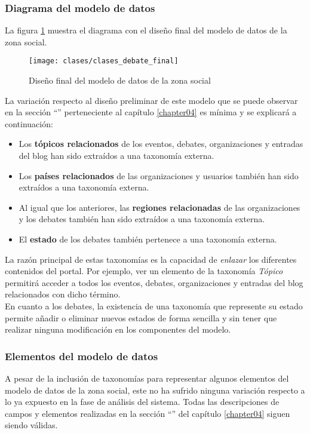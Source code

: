 \subsubsection{Diagrama del modelo de datos}
La figura \ref{fig:diagrama_modelo_social_final} muestra el diagrama con el diseño final del modelo de datos de la zona social.
\begin{landscape}
	\begin{figure}[h]
		\centering
		\texttt{[image: clases/clases\_debate\_final]}
		\caption{Diseño final del modelo de datos de la zona social}
		\label{fig:diagrama_modelo_social_final}
	\end{figure}
\end{landscape}

La variación respecto al diseño preliminar de este modelo que se puede observar en la sección ``'' perteneciente al capítulo \ref{chapter04} es mínima y se explicará a continuación:
\begin{itemize}
	\item Los \textbf{tópicos relacionados} de los eventos, debates, organizaciones y entradas del blog han sido extraídos a una taxonomía externa.
	\item Los \textbf{países relacionados} de las organizaciones y usuarios también han sido extraídos a una taxonomía externa.
	\item Al igual que los anteriores, las \textbf{regiones relacionadas} de las organizaciones y los debates también han sido extraídos a una taxonomía externa.
	\item El \textbf{estado} de los debates también pertenece a una taxonomía externa.
\end{itemize}

La razón principal de estas taxonomías es la capacidad de \textit{enlazar} los diferentes contenidos del portal.  Por ejemplo, ver un elemento de la taxonomía \textit{Tópico} permitirá acceder a todos los eventos, debates, organizaciones y entradas del blog relacionados con dicho término.\\
En cuanto a los debates, la existencia de una taxonomía que represente su estado permite añadir o eliminar nuevos estados de forma sencilla y sin tener que realizar ninguna modificación en los componentes del modelo.

\subsubsection{Elementos del modelo de datos}
A pesar de la inclusión de taxonomías para representar algunos elementos del modelo de datos de la zona social, este no ha sufrido ninguna variación respecto a lo ya expuesto en la fase de análisis del sistema. Todas las descripciones de campos y elementos realizadas en la sección ``'' del capítulo \ref{chapter04} siguen siendo válidas.